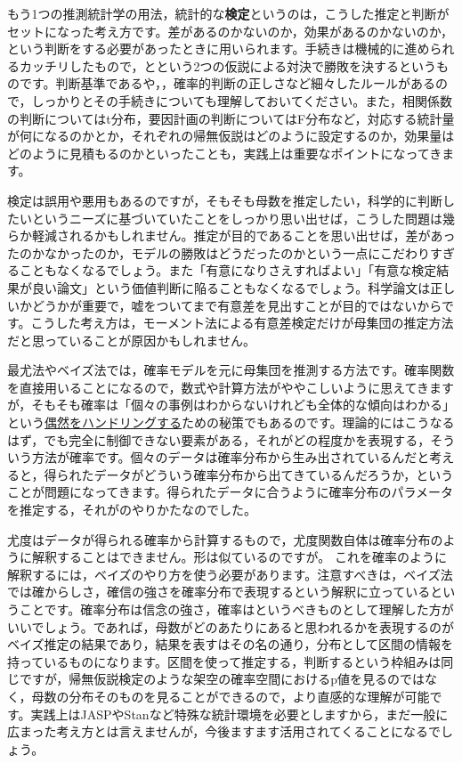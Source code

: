 \documentclass{ltjbook}
\begin{document}
もう1つの推測統計学の用法，統計的な\textbf{検定}というのは，こうした推定と判断がセットになった考え方です。差があるのかないのか，効果があるのかないのか，という判断をする必要があったときに用いられます。手続きは機械的に進められるカッチリしたもので，とという2つの仮説による対決で勝敗を決するというものです。判断基準であるや，，確率的判断の正しさなど細々したルールがあるので，しっかりとその手続きについても理解しておいてください。また，相関係数の判断についてはt分布，要因計画の判断についてはF分布など，対応する統計量が何になるのかとか，それぞれの帰無仮説はどのように設定するのか，効果量はどのように見積もるのかといったことも，実践上は重要なポイントになってきます。

検定は誤用や悪用もあるのですが，そもそも母数を推定したい，科学的に判断したいというニーズに基づいていたことをしっかり思い出せば，こうした問題は幾らか軽減されるかもしれません。推定が目的であることを思い出せば，差があったのかなかったのか，モデルの勝敗はどうだったのかという一点にこだわりすぎることもなくなるでしょう。また「有意になりさえすればよい」「有意な検定結果が良い論文」という価値判断に陥ることもなくなるでしょう。科学論文は正しいかどうかが重要で，嘘をついてまで有意差を見出すことが目的ではないからです。こうした考え方は，モーメント法による有意差検定だけが母集団の推定方法だと思っていることが原因かもしれません。

最尤法やベイズ法では，確率モデルを元に母集団を推測する方法です。確率関数を直接用いることになるので，数式や計算方法がややこしいように思えてきますが，そもそも確率は「個々の事例はわからないけれども全体的な傾向はわかる」という\underline{偶然をハンドリングする}ための秘策でもあるのです。理論的にはこうなるはず，でも完全に制御できない要素がある，それがどの程度かを表現する，そういう方法が確率です。個々のデータは確率分布から生み出されているんだと考えると，得られたデータがどういう確率分布から出てきているんだろうか，ということが問題になってきます。得られたデータに合うように確率分布のパラメータを推定する，それがのやりかたなのでした。

尤度はデータが得られる確率から計算するもので，尤度関数自体は確率分布のように解釈することはできません。形は似ているのですが。
これを確率のように解釈するには，ベイズのやり方を使う必要があります。注意すべきは，ベイズ法では確からしさ，確信の強さを確率分布で表現するという解釈に立っているということです。確率分布は信念の強さ，確率はというべきものとして理解した方がいいでしょう。であれば，母数がどのあたりにあると思われるかを表現するのがベイズ推定の結果であり，結果を表すはその名の通り，分布として区間の情報を持っているものになります。区間を使って推定する，判断するという枠組みは同じですが，帰無仮説検定のような架空の確率空間におけるp値を見るのではなく，母数の分布そのものを見ることができるので，より直感的な理解が可能です。実践上はJASPやStanなど特殊な統計環境を必要としますから，まだ一般に広まった考え方とは言えませんが，今後ますます活用されてくることになるでしょう。
\end{document}
